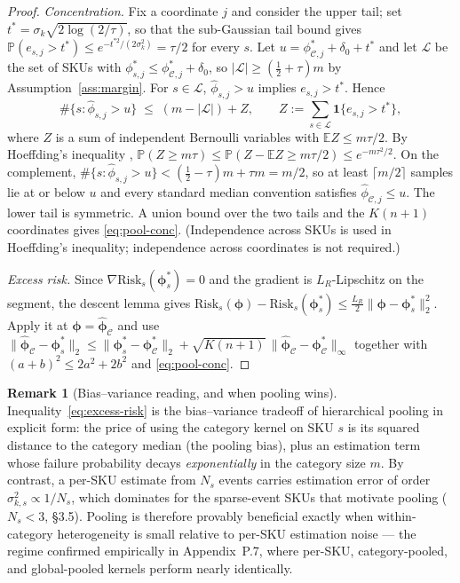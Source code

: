 \documentclass[10pt]{article} %
\theoremstyle{plain}
\theoremstyle{definition}
\newtheorem{remark}{Remark}
\begin{document}
\begin{proof}
\emph{Concentration.} Fix a coordinate $j$ and consider the upper
tail; set $t^{*}=\sigma_{k}\sqrt{2\log(2/\tau)}$, so that the
sub-Gaussian tail bound gives
$\mathbb{P}(e_{s,j} > t^{*}) \le e^{-t^{*2}/(2\sigma_{k}^{2})}
= \tau/2$ for every $s$. Let
$u = \phi^{*}_{\mathcal{C},j}+\delta_{0}+t^{*}$ and let
$\mathcal{L}$ be the set of SKUs with
$\phi^{*}_{s,j}\le\phi^{*}_{\mathcal{C},j}+\delta_{0}$, so
$|\mathcal{L}|\ge(\tfrac12+\tau)m$ by
Assumption~\ref{ass:margin}. For $s\in\mathcal{L}$,
$\hat{\phi}_{s,j} > u$ implies $e_{s,j} > t^{*}$. Hence
\begin{equation}
\#\{s: \hat{\phi}_{s,j} > u\}
\;\le\; (m - |\mathcal{L}|) + Z,
\qquad
Z := \sum_{s\in\mathcal{L}} \mathbf{1}\{e_{s,j}>t^{*}\},
\end{equation}
where $Z$ is a sum of independent Bernoulli variables with
$\mathbb{E}Z \le m\tau/2$. By Hoeffding's inequality
\citep{Hoeffding1963},
$\mathbb{P}(Z \ge m\tau)
\le \mathbb{P}(Z-\mathbb{E}Z \ge m\tau/2)
\le e^{-m\tau^{2}/2}$. On the complement,
$\#\{s:\hat{\phi}_{s,j}>u\}
< (\tfrac12-\tau)m + \tau m = m/2$, so at least $\lceil m/2\rceil$
samples lie at or below $u$ and every standard median convention
satisfies $\hat{\phi}_{\mathcal{C},j}\le u$. The lower tail is
symmetric. A union bound over the two tails and the $K(n{+}1)$
coordinates gives \eqref{eq:pool-conc}. (Independence across SKUs is
used in Hoeffding's inequality; independence across coordinates is not
required.)

\emph{Excess risk.} Since $\nabla\mathrm{Risk}_{s}
(\boldsymbol{\phi}^{*}_{s})=0$ and the gradient is $L_{R}$-Lipschitz
on the segment, the descent lemma gives
$\mathrm{Risk}_{s}(\boldsymbol{\phi})
-\mathrm{Risk}_{s}(\boldsymbol{\phi}^{*}_{s})
\le \tfrac{L_{R}}{2}\|\boldsymbol{\phi}
-\boldsymbol{\phi}^{*}_{s}\|_{2}^{2}$. Apply it at
$\boldsymbol{\phi}=\hat{\boldsymbol{\phi}}_{\mathcal{C}}$ and use
$\|\hat{\boldsymbol{\phi}}_{\mathcal{C}}
-\boldsymbol{\phi}^{*}_{s}\|_{2}
\le \|\boldsymbol{\phi}^{*}_{s}
-\boldsymbol{\phi}^{*}_{\mathcal{C}}\|_{2}
+ \sqrt{K(n{+}1)}\,\|\hat{\boldsymbol{\phi}}_{\mathcal{C}}
-\boldsymbol{\phi}^{*}_{\mathcal{C}}\|_{\infty}$ together with
$(a+b)^{2}\le 2a^{2}+2b^{2}$ and \eqref{eq:pool-conc}.
\end{proof}

\begin{remark}[Bias--variance reading, and when pooling wins]
Inequality~\eqref{eq:excess-risk} is the bias--variance tradeoff of
hierarchical pooling in explicit form: the price of using the category
kernel on SKU $s$ is its squared distance to the category median (the
pooling bias), plus an estimation term whose failure probability
decays \emph{exponentially} in the category size $m$. By contrast, a
per-SKU estimate from $N_{s}$ events carries estimation error of order
$\sigma_{k,s}^{2}\propto 1/N_{s}$, which dominates for the sparse-event
SKUs that motivate pooling ($N_{s}<3$, \S3.5). Pooling is therefore
provably beneficial exactly when within-category heterogeneity is
small relative to per-SKU estimation noise --- the regime confirmed
empirically in Appendix~P.7, where per-SKU, category-pooled, and
global-pooled kernels perform nearly identically.
\end{remark}
\end{document}
